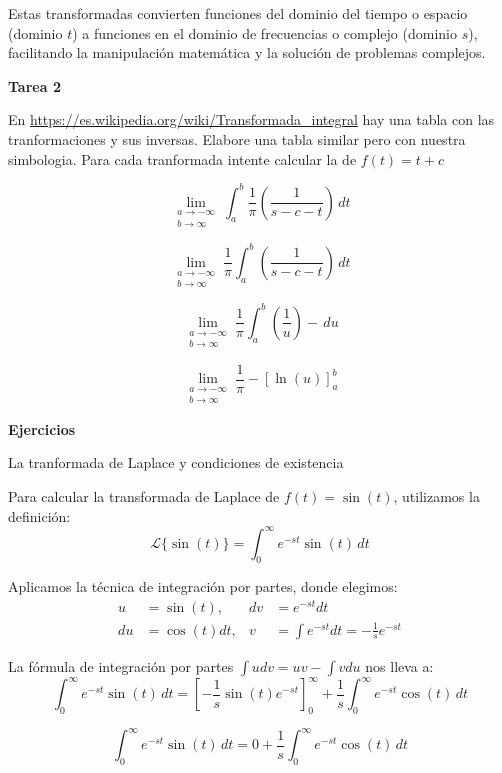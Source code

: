 \documentclass{article}
\begin{document}
Estas transformadas convierten funciones del dominio del tiempo o espacio (dominio $t$) a funciones en el dominio de frecuencias o complejo (dominio $s$), facilitando la manipulación matemática y la solución de problemas complejos.

\vspace{.25cm}

\textbf{Tarea 2}

En \url{https://es.wikipedia.org/wiki/Transformada_integral} hay una tabla con las tranformaciones y sus inversas. Elabore una tabla similar pero con nuestra simbologia. Para cada tranformada intente calcular la de $f(t) = t + c$

\[
    \lim_{\substack{a \to -\infty \\ b \to \infty}} \int_{a}^{b} \frac{1}{\pi}\left(\frac{1}{s-c-t}\right) \, dt
\]

\[
    \lim_{\substack{a \to -\infty \\ b \to \infty}}  \frac{1}{\pi} \int_{a}^{b} \left(\frac{1}{s-c-t}\right) \, dt
\]

\[
    \lim_{\substack{a \to -\infty \\ b \to \infty}}  \frac{1}{\pi} \int_{a}^{b} \left(\frac{1}{u}\right) - \, du
\]

\[ \lim_{\substack{a \to -\infty \\ b \to \infty}}  \frac{1}{\pi} - \left[\ln(u)\right]_{a}^{b}\]

\textbf{Ejercicios}

La tranformada de Laplace y condiciones de existencia

Para calcular la transformada de Laplace de \(f(t) = \sin(t)\), utilizamos la definición:
\[
    \mathcal{L}\{\sin(t)\} = \int_{0}^{\infty} e^{-st} \sin(t) \, dt
\]

Aplicamos la técnica de integración por partes, donde elegimos:
\begin{align*}
    u  & = \sin(t),    & dv & = e^{-st} dt                            \\
    du & = \cos(t) dt, & v  & = \int e^{-st} dt = -\frac{1}{s}e^{-st}
\end{align*}

La fórmula de integración por partes \(\int u dv = uv - \int v du\) nos lleva a:
\[
    \int_{0}^{\infty} e^{-st} \sin(t) \, dt = \left[-\frac{1}{s} \sin(t) e^{-st}\right]_{0}^{\infty} + \frac{1}{s} \int_{0}^{\infty} e^{-st} \cos(t) \, dt
\]

\[
    \int_{0}^{\infty} e^{-st} \sin(t) \, dt = 0 + \frac{1}{s} \int_{0}^{\infty} e^{-st} \cos(t) \, dt
\]
\end{document}
